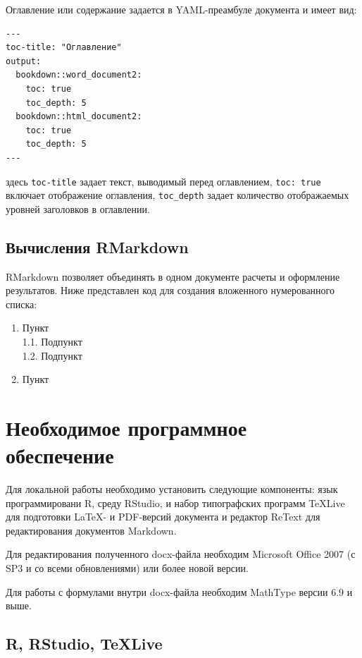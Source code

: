 \documentclass[
  a4paper,
]{book}
\providecommand{\tightlist}{%
  \setlength{\itemsep}{0pt}\setlength{\parskip}{0pt}}
\theoremstyle{definition}
\theoremstyle{definition}
\theoremstyle{definition}
\theoremstyle{definition}
\theoremstyle{remark}
\begin{document}
Оглавление или содержание задается в YAML-преамбуле документа и имеет вид:

\begin{verbatim}
---
toc-title: "Оглавление"
output:
  bookdown::word_document2:
    toc: true
    toc_depth: 5
  bookdown::html_document2:
    toc: true
    toc_depth: 5
---
\end{verbatim}

здесь \texttt{toc-title} задает текст, выводимый перед оглавлением, \texttt{toc:\ true} включает отображение оглавления, \texttt{toc\_depth} задает количество отображаемых уровней заголовков в оглавлении.

\subsection{Вычисления RMarkdown}\label{markdown-rmarkdown}

RMarkdown позволяет объединять в одном документе расчеты и оформление результатов. Ниже представлен код для создания вложенного нумерованного списка:

\begin{enumerate}
\def\labelenumi{\arabic{enumi}.}
\tightlist
\item
  Пункт\\
  1.1. Подпункт\\
  1.2. Подпункт\\
\item
  Пункт
\end{enumerate}

\section{Необходимое программное обеспечение}\label{software}

Для локальной работы необходимо установить следующие компоненты: язык программировани R, среду RStudio, и набор типографских программ TeXLive для подготовки LaTeX- и PDF-версий документа и редактор ReText для редактирования документов Markdown.

Для редактирования полученного docx-файла необходим Microsoft Office 2007 (с SP3 и со всеми обновлениями) или более новой версии.

Для работы с формулами внутри docx-файла необходим MathType версии 6.9 и выше.

\subsection{R, RStudio, TeXLive}\label{software-r}
\end{document}
